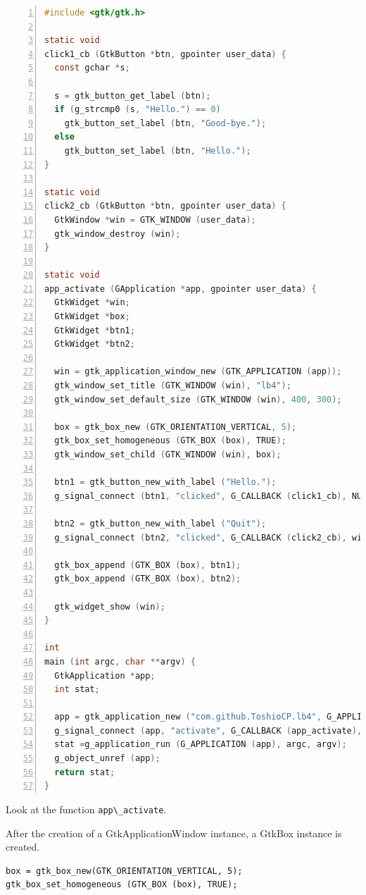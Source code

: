\begin{lstlisting}[language=C, numbers=left]
#include <gtk/gtk.h>

static void
click1_cb (GtkButton *btn, gpointer user_data) {
  const gchar *s;

  s = gtk_button_get_label (btn);
  if (g_strcmp0 (s, "Hello.") == 0)
    gtk_button_set_label (btn, "Good-bye.");
  else
    gtk_button_set_label (btn, "Hello.");
}

static void
click2_cb (GtkButton *btn, gpointer user_data) {
  GtkWindow *win = GTK_WINDOW (user_data);
  gtk_window_destroy (win);
}

static void
app_activate (GApplication *app, gpointer user_data) {
  GtkWidget *win;
  GtkWidget *box;
  GtkWidget *btn1;
  GtkWidget *btn2;

  win = gtk_application_window_new (GTK_APPLICATION (app));
  gtk_window_set_title (GTK_WINDOW (win), "lb4");
  gtk_window_set_default_size (GTK_WINDOW (win), 400, 300);

  box = gtk_box_new (GTK_ORIENTATION_VERTICAL, 5);
  gtk_box_set_homogeneous (GTK_BOX (box), TRUE);
  gtk_window_set_child (GTK_WINDOW (win), box);

  btn1 = gtk_button_new_with_label ("Hello.");
  g_signal_connect (btn1, "clicked", G_CALLBACK (click1_cb), NULL);

  btn2 = gtk_button_new_with_label ("Quit");
  g_signal_connect (btn2, "clicked", G_CALLBACK (click2_cb), win);

  gtk_box_append (GTK_BOX (box), btn1);
  gtk_box_append (GTK_BOX (box), btn2);

  gtk_widget_show (win);
}

int
main (int argc, char **argv) {
  GtkApplication *app;
  int stat;

  app = gtk_application_new ("com.github.ToshioCP.lb4", G_APPLICATION_FLAGS_NONE);
  g_signal_connect (app, "activate", G_CALLBACK (app_activate), NULL);
  stat =g_application_run (G_APPLICATION (app), argc, argv);
  g_object_unref (app);
  return stat;
}
\end{lstlisting}

Look at the function \passthrough{\lstinline!app\_activate!}.

After the creation of a GtkApplicationWindow instance, a GtkBox instance
is created.

\begin{lstlisting}
box = gtk_box_new(GTK_ORIENTATION_VERTICAL, 5);
gtk_box_set_homogeneous (GTK_BOX (box), TRUE);
\end{lstlisting}

